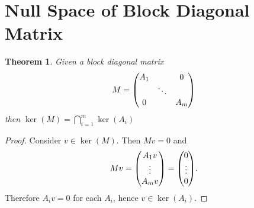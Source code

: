 \documentclass{article}
\newtheorem{theorem}{Theorem}
\begin{document}
\section*{Null Space of Block Diagonal Matrix}
\begin{theorem}
    Given a block diagonal matrix
    \[
        M = \mqty(
        A_1 & & 0 \\
        & \ddots & \\
        0 & & A_m
        )
    \]
    then $\ker(M) = \displaystyle\bigcap_{i=1}^m \ker(A_i)$
\end{theorem}

\begin{proof}
    Consider $v \in \ker(M)$. Then $Mv = 0$ and
    \[
        M v = \mqty(
        A_1 v \\
        \vdots \\
        A_m v
        ) = \mqty(
        0 \\
        \vdots \\
        0 \\
        )
    .\]
    Therefore $A_i v = 0$ for each $A_i$, hence $v \in \ker(A_i)$.
\end{proof}
\end{document}
